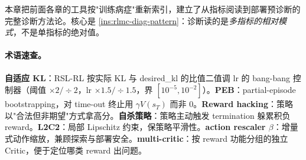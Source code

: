 本章把前面各章的工具按"训练病症"重新索引，建立了从指标阅读到部署预诊断的完整诊断方法论。核心是 \cref{ins:rlmc-diag-pattern}：诊断读的是\emph{多指标的相对模式}，不是单指标的绝对值。

\paragraph{术语速查。}\textbf{自适应 KL}：RSL-RL 按实际 KL 与 desired\_kl 的比值二值调 lr 的 bang-bang 控制器（阈值 $\times2/\div2$，lr $\times1.5/\div1.5$，界 $[10^{-5},10^{-2}]$）。\textbf{PEB}：partial-episode bootstrapping，对 time-out 终止用 $\gamma V(s_T)$ 而非 0。\textbf{Reward hacking}：策略以"合法但非期望"方式拿高分。\textbf{自杀策略}：策略主动触发 termination 躲累积负 reward。\textbf{L2C2}：局部 Lipschitz 约束，保策略平滑性。\textbf{action rescaler $\beta$}：增量式动作缩放，兼顾探索与部署安全。\textbf{multi-critic}：按 reward 功能分组的独立 Critic，便于定位哪类 reward 出问题。

